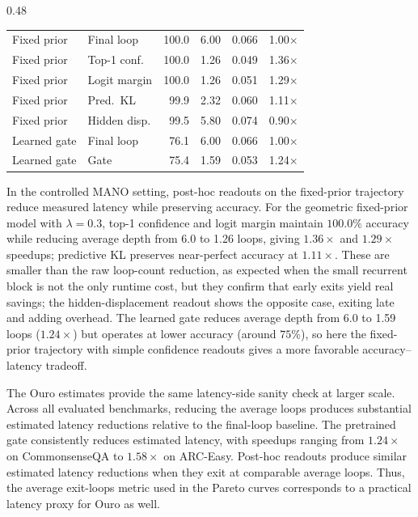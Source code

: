 \documentclass[10pt]{article} %
\begin{document}
\begin{table}[t]
\begin{subtable}[t]{0.48\linewidth}
{\begin{tabular}{llrrrr}
\midrule
Fixed prior & Final loop & 100.0 & 6.00 & 0.066 & 1.00$\times$ \\
Fixed prior & Top-1 conf. & 100.0 & 1.26 & 0.049 & 1.36$\times$ \\
Fixed prior & Logit margin & 100.0 & 1.26 & 0.051 & 1.29$\times$ \\
Fixed prior & Pred.\ KL & 99.9 & 2.32 & 0.060 & 1.11$\times$ \\
Fixed prior & Hidden disp. & 99.5 & 5.80 & 0.074 & 0.90$\times$ \\
\midrule
Learned gate & Final loop & 76.1 & 6.00 & 0.066 & 1.00$\times$ \\
Learned gate & Gate & 75.4 & 1.59 & 0.053 & 1.24$\times$ \\
\bottomrule
\end{tabular}
}
\end{subtable}

\end{table}

In the controlled MANO setting, post-hoc readouts on the fixed-prior trajectory reduce measured latency while preserving accuracy. For the geometric fixed-prior model with \(\lambda=0.3\), top-1 confidence and logit margin maintain \(100.0\%\) accuracy while reducing average depth from 6.0 to 1.26 loops, giving \(1.36\times\) and \(1.29\times\) speedups; predictive KL preserves near-perfect accuracy at \(1.11\times\). These are smaller than the raw loop-count reduction, as expected when the small recurrent block is not the only runtime cost, but they confirm that early exits yield real savings; the hidden-displacement readout shows the opposite case, exiting late and adding overhead. The learned gate reduces average depth from 6.0 to 1.59 loops (\(1.24\times\)) but operates at lower accuracy (around \(75\%\)), so here the fixed-prior trajectory with simple confidence readouts gives a more favorable accuracy--latency tradeoff.

The Ouro estimates provide the same latency-side sanity check at larger scale. Across all evaluated benchmarks, reducing the average loops produces substantial estimated latency reductions relative to the final-loop baseline. The pretrained gate consistently reduces estimated latency, with speedups ranging from \(1.24\times\) on CommonsenseQA to \(1.58\times\) on ARC-Easy. Post-hoc readouts produce similar estimated latency reductions when they exit at comparable average loops. Thus, the average exit-loops metric used in the Pareto curves corresponds to a practical latency proxy for Ouro as well.
\end{document}
